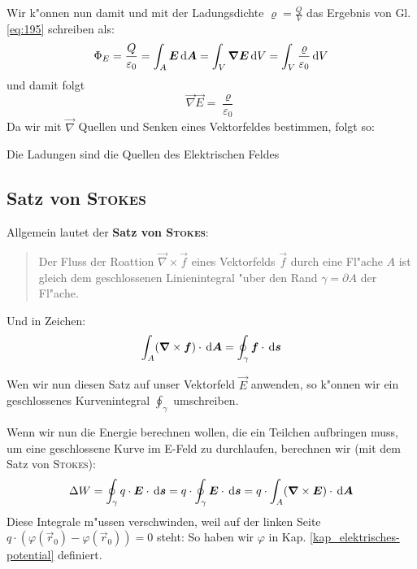Wir k"onnen nun damit und mit der Ladungsdichte $\varrho = \frac{Q}{V}$ das Ergebnis von
Gl. \eqref{eq:195}
schreiben als:
\begin{equation}
\label{eq:197}
   \Phi_E = \frac{Q}{\varepsilon_0}
=\int_A \boldsymbol{E} \, \mathrm{d} \boldsymbol{A} =
 \int_V  \boldsymbol{\nabla} \boldsymbol{E} \, \mathrm{d} V =
  \int_V \frac{\varrho}{\varepsilon_0} \, \mathrm{d} V
\end{equation}
und damit folgt
\begin{equation}
   \label{eq:192}
 \boxed{  \vec \nabla \vec E = \frac{\varrho}{\varepsilon_0}}
\end{equation}
Da wir mit $\vec \nabla$ Quellen und Senken eines Vektorfeldes
bestimmen, folgt so:
\begin{Wichtig}
   Die Ladungen sind die Quellen des Elektrischen Feldes
\end{Wichtig}




\subsection{Satz von \textsc{Stokes}}
\label{kap_satz-von-stokes}


Allgemein lautet der \textbf{Satz von
  \textsc{Stokes}}:
\begin{quote}
   Der Fluss der Roattion $\vec \nabla \times \vec f$ eines Vektorfelds
   $\vec f$ durch eine Fl"ache $A$ ist gleich dem geschlossenen
   Linienintegral "uber den Rand $\gamma = \partial A$ der Fl"ache.
\end{quote}
Und in Zeichen:
\begin{equation}
   \label{eqn_satz-von-stokes_mathematisch}
   \int_A (\boldsymbol{\nabla} \times \boldsymbol{f}) \cdot \, \mathrm{d} \boldsymbol{A} = \oint_\gamma \boldsymbol{f}
   \cdot \, \mathrm{d} \boldsymbol{s}
\end{equation}

Wen wir nun diesen Satz auf unser Vektorfeld $\vec E$ anwenden, so
k"onnen wir ein geschlossenes Kurvenintegral $\oint_\gamma$
umschreiben.

Wenn wir nun die Energie berechnen wollen, die ein Teilchen aufbringen
muss, um eine geschlossene Kurve im E-Feld zu durchlaufen, berechnen
wir (mit dem Satz von \textsc{Stokes}):
\begin{equation}
   \label{eq:198}
   \Delta W =
   \oint_\gamma q \cdot \boldsymbol{E} \cdot  \, \mathrm{d} \boldsymbol{s} =  
   q \cdot  \oint_\gamma \boldsymbol{E} \cdot  \, \mathrm{d} \boldsymbol{s} = 
   q \cdot  \int_A (\boldsymbol{\nabla} \times \boldsymbol{E}) \cdot \, \mathrm{d} \boldsymbol{A}
\end{equation}
Diese Integrale m"ussen verschwinden, weil auf der linken Seite $q
\cdot \left (\varphi(\vec r_0) - \varphi(\vec r_0) \right) = 0$ steht:
So haben wir $\varphi$ in Kap. \ref{kap_elektrisches-potential}
definiert. 


